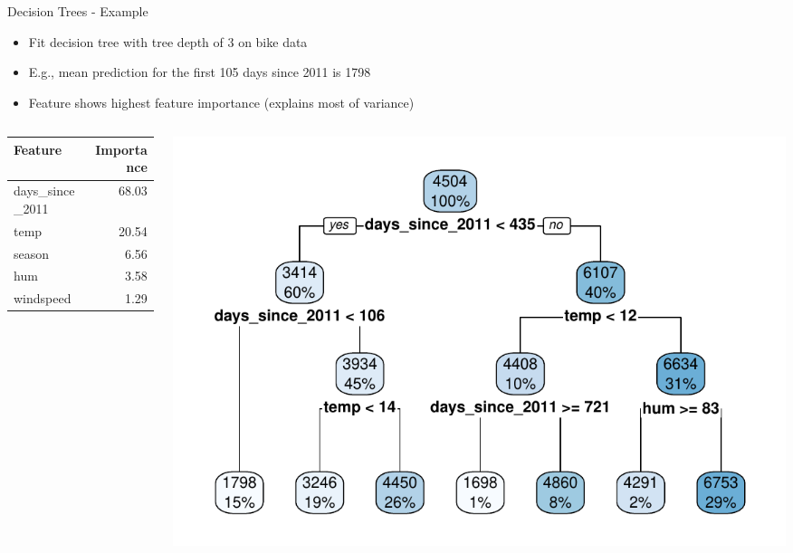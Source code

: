 \documentclass[11pt,compress,t,notes=noshow, aspectratio=169, xcolor=table]{beamer}
\begin{document}
\begin{frame}{Decision Trees - Example}
\begin{itemize}
    \item Fit decision tree with tree depth of 3 on bike data
    \item E.g., mean prediction for the first 105 days since 2011 is 1798
    \item Feature  shows highest feature importance (explains most of variance)
\end{itemize}
\begin{columns}[T]
\begin{column}{0.4\textwidth}
\begin{table}[ht]
\centering
\begin{tabular}{lr}
  \hline
Feature & Importance \\ 
  \hline
days\_since\_2011 & 68.03 \\ 
  temp & 20.54 \\ 
  season & 6.56 \\ 
  hum & 3.58 \\ 
  windspeed & 1.29 \\ 
   \hline
\end{tabular}
\end{table}
\end{column}
\begin{column}{0.6\textwidth}
  \includegraphics[width = \textwidth]{figure/tree.pdf} 
\end{column}
\end{columns}
 
\end{frame}
\end{document}
